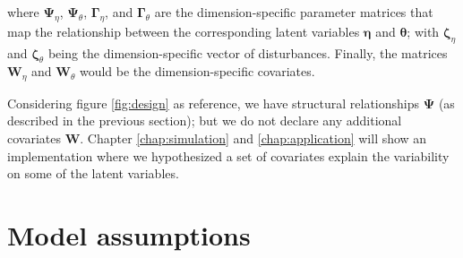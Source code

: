 \noindent where $\pmb{\Psi}_{\eta}$, $\pmb{\Psi}_{\theta}$, $\pmb{\Gamma}_{\eta}$, and $\pmb{\Gamma}_{\theta}$ are the dimension-specific parameter matrices that map the relationship between the corresponding latent variables $\pmb{\eta}$ and $\pmb{\theta}$; with  $\pmb{\zeta}_{\eta}$ and $\pmb{\zeta}_{\theta}$ being the dimension-specific vector of disturbances. Finally, the matrices $\mathbf{W}_{\eta}$ and $\mathbf{W}_{\theta}$ would be the dimension-specific covariates. 

Considering figure \ref{fig:design} as reference, we have structural relationships $\pmb{\Psi}$ (as described in the previous section); but we do not declare any additional covariates $\mathbf{W}$. Chapter \ref{chap:simulation} and \ref{chap:application} will show an implementation where we hypothesized a set of covariates explain the variability on some of the latent variables.


\section{Model assumptions} \label{s_sect:assump}

